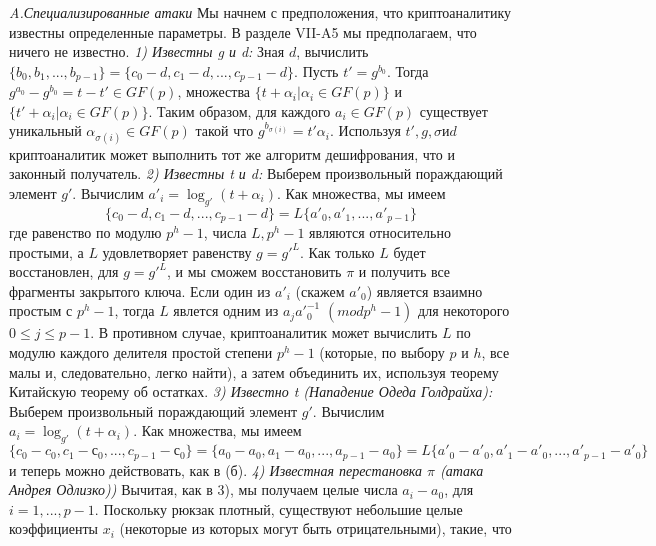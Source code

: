 \documentclass[a4paper,12pt]{article}
\begin{document}
\textsl{A.Специализированные атаки} \newline
Мы начнем с предположения, что криптоаналитику известны определенные параметры. В разделе VII-A5 мы предполагаем, что ничего не известно. \newline
\indent \textsl{1) Известны g и d:} \newline
Зная $d$, вычислить $\{b_0, b_1, ..., b_{p-1} \} = \{c_0 -d, c_1 - d, ..., c_{p-1} -d \}$. Пусть $t'= g^{b_0}$. Тогда $g^{a_0} - g^{b_0} = t - t' \in GF(p)$, множества $\{t + \alpha_i|\alpha_i \in GF(p) \}$ и $\{t' + \alpha_i|\alpha_i \in GF(p) \}$. Таким образом, для каждого $a_i \in GF(p)$ существует уникальный $\alpha_{\sigma(i)} \in GF(p)$ такой что $g^{b_{\sigma(i)}} = t' \alpha_i$. Используя $t', g, \sigma и d$ криптоаналитик может выполнить тот же алгоритм дешифрования, что и законный получатель. \newline
\indent \textsl{2) Известны t и d:} \newline
Выберем произвольный пораждающий элемент $g'$. Вычислим $a'_i = \log_{g'}(t + \alpha_i)$. Как множества, мы имеем $$ \{c_0 -d, c_1 - d, ..., c_{p-1} -d \} = L\{a'_0, a'_1, ..., a'_{p-1} \}$$
где равенство по модулю $p^h - 1$, числа $L, p^h - 1$ являются относительно простыми, а $L$ удовлетворяет равенству $g = g'^L$. Как только $L$ будет восстановлен, для $g = g'^L$, и мы сможем восстановить $\pi$ и получить все фрагменты закрытого ключа. \newline
\indent Если один из $a'_i$ (скажем $a'_0$) является взаимно простым с $p^h - 1$, тогда $L$ явлется одним из $a_j a'_0^{-1}$ $(mod p^h -1)$ для некоторого $ 0 \leq j \leq p-1$. В противном случае, криптоаналитик может вычислить $L$ по модулю каждого делителя простой степени $p^h -1$ (которые, по выбору $p$ и $h$, все малы и, следовательно, легко найти), а затем объединить их, используя теорему Китайскую теорему об остатках. \newline
\indent \textsl{3) Известно t (Нападение Одеда Голдрайха):} \newline
Выберем произвольный пораждающий элемент $g'$. Вычислим $a_i = \log_{g'}(t + \alpha_i)$. Как множества, мы имеем $$ \{c_0 -c_0, c_1 - с_0, ..., c_{p-1} -с_0 \} = \{a_0 - a_0, a_1 - a_0, ..., a_{p-1} -a_0 \} = L\{a'_0 -a'_0 , a'_1 - a'_0, ..., a'_{p-1} - a'_0 \}$$
и теперь можно действовать, как в (б). \newline
\indent \textsl{ 4) Известная перестановка $\pi$ (атака Андрея Одлизко)) } \newline
Вычитая, как в 3), мы получаем целые числа $a_i - a_0$, для $i = 1, ..., p - 1$. Поскольку рюкзак плотный, существуют небольшие целые коэффициенты $x_i$ (некоторые из которых могут быть отрицательными), такие, что
\end{document}

